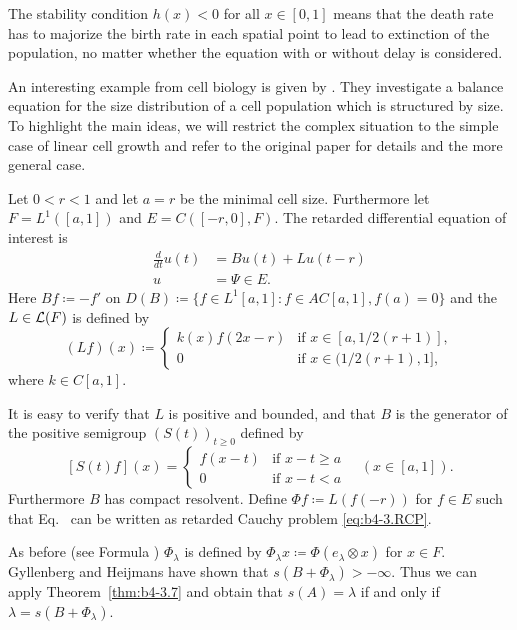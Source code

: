 	The stability condition $h(x) < 0$ for all $x \in [0,1]$ means that the death rate has to majorize the birth rate in each spatial point to lead to extinction of the population, no matter whether the equation with or without delay is considered.
\begin{example}\label{ex:b4-3.12}
	An interesting example from cell biology is given by \textcite{gyllenbergheijmans:1987}. 
	They investigate a balance equation for the size distribution of a cell population which is structured by size. 
	To highlight the main ideas, we will restrict the complex situation to the simple case of linear cell growth and refer to the original paper for details and the more general case.
	
    Let $0 < r < 1$ and let $a = r$ be the minimal cell size. 
    Furthermore let $F = L^1([a,1])$ and $E = C([-r,0],F)$. 
    The retarded differential equation of interest is 
    \begin{equation}\label{eq:b4-3.12}
            \begin{aligned}
        \frac{d}{dt}u(t) &= Bu(t) + Lu(t-r)\\
        u &= \Psi \in E.
        \end{aligned}
    \end{equation}
Here $Bf  \coloneq  -f'$ on $D(B) \coloneq \{f \in L^1[a,1] \colon f \in AC[a,1], f(a) = 0\}$ and the $L \in \mathcal{L}(F) $ is defined by
\[
(Lf)(x) \coloneq 
\begin{cases}
	k(x)f(2x-r) & \text{if } x \in [a,1/2(r+1)] , \\
	0 & \text{if } x \in (1/2(r+1),1] ,
\end{cases}
\]
where $k \in C[a,1]$.

It is easy to verify that $L$ is positive and bounded, and that $B$ is the generator of the positive semigroup $(S(t))_{t\geq0}$ defined by
\[
[S(t)f](x) = 
\begin{cases}
	f(x-t) & \text{if } x-t \geq a \\
	0 & \text{if } x-t < a
\end{cases}
\quad (x \in [a,1]).
\]
Furthermore $B$ has compact resolvent. 
Define $\Phi f  \coloneq  L(f(-r))$ for $f \in E$ such that Eq.~ can be written as retarded Cauchy problem \eqref{eq:b4-3.RCP}.

As before (see Formula ) $\Phi_{\lambda}$ is defined by $\Phi_{\lambda}x  \coloneq  \Phi(e_{\lambda}\otimes x)$ for $x \in F$. 
Gyllenberg and Heijmans have shown that $s(B + \Phi_{\lambda}) > -\infty$. 
Thus we can apply Theorem~\ref{thm:b4-3.7} and obtain that $s(A) = \lambda$ if and only if\/ $\lambda = s(B + \Phi_{\lambda})$.
\end{example}
